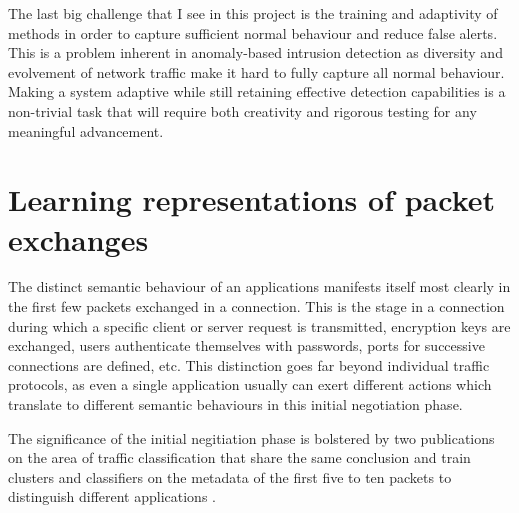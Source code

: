 \documentclass[a4paper,12pt,twoside]{report}
\begin{document}
The last big challenge that I see in this project is the training and adaptivity of methods in order to capture sufficient normal behaviour and reduce false alerts. This is a problem inherent in anomaly-based intrusion detection as diversity and evolvement of network traffic make it hard to fully capture all normal behaviour. Making a system adaptive while still retaining effective detection capabilities is 
a non-trivial task that will require both creativity and rigorous testing for any meaningful advancement.






\section{Learning representations of packet exchanges}\label{Repr}

The distinct semantic behaviour of an applications manifests itself most clearly in the first few packets exchanged in a connection. This is the stage in a connection during which a specific client or server request is transmitted, encryption keys are exchanged, users authenticate themselves with passwords, ports for successive connections are defined, etc. This distinction goes far beyond individual traffic protocols, as even a single application usually can exert different actions which translate to different semantic behaviours in this initial negotiation phase. 

The significance of the initial negitiation phase is bolstered by two publications on the area of traffic classification that share the same conclusion and train clusters and classifiers on the metadata of the first five to ten packets to distinguish different applications \cite{bernaille2006traffic,crotti2007traffic}.
\end{document}
